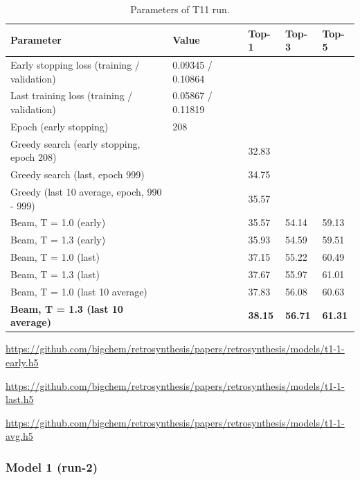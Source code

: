 \documentclass{article}
\begin{document}
\begin{table}[h!]
\caption{Parameters of T11 run.}
  \centering
  \begin{tabular}{p{6.2cm}p{3.5cm}p{1.5cm}p{1.5cm}p{1.5cm}}
    \toprule
    Parameter & Value & Top-1 & Top-3 & Top-5 \\
    \midrule
    Early stopping loss (training / validation) &  0.09345 / 0.10864 & & & \\
    Last training loss (training / validation) &  0.05867 / 0.11819& & & \\
    Epoch (early stopping) & 208 & & & \\
    \midrule
    Greedy search (early stopping, epoch 208) & & 32.83 & &\\
    Greedy search (last, epoch 999) & & 34.75 & & \\
    Greedy (last 10 average, epoch, 990 - 999) & & 35.57 & & \\
    \midrule
    Beam, T = 1.0 (early) & & 35.57 & 54.14 & 59.13 \\
    Beam, T = 1.3 (early) & & 35.93 & 54.59 & 59.51 \\ 
    \midrule
    Beam, T = 1.0 (last) & & 37.15 & 55.22 &  60.49 \\
    Beam, T = 1.3 (last) & & 37.67 & 55.97 & 61.01 \\ 
    \midrule
    Beam, T = 1.0 (last 10 average) & & 37.83 & 56.08 &  60.63 \\
    \textbf{Beam, T = 1.3 (last 10 average)}  & & \textbf{38.15} & \textbf{56.71} & \textbf{61.31} \\ 
    \bottomrule
  \end{tabular}
  \label{tbl:t11}

\end{table} 


\url{https://github.com/bigchem/retrosynthesis/papers/retrosynthesis/models/t1-1-early.h5}

\url{https://github.com/bigchem/retrosynthesis/papers/retrosynthesis/models/t1-1-last.h5}

\url{https://github.com/bigchem/retrosynthesis/papers/retrosynthesis/models/t1-1-avg.h5}


\newpage

\subsubsection{Model 1 (run-2)}
  
\end{document}
